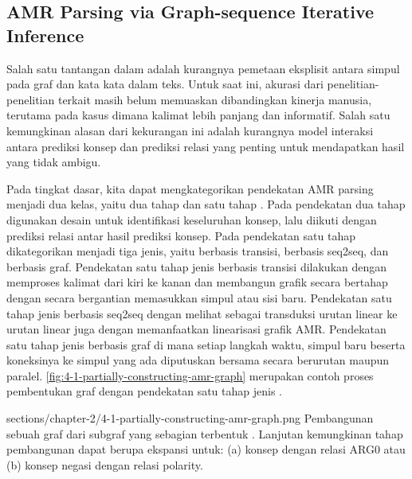 \subsection{AMR Parsing via Graph-sequence Iterative Inference }

Salah satu tantangan dalam \amrparsing{} adalah kurangnya pemetaan eksplisit antara simpul pada graf dan kata kata dalam teks.
Untuk saat ini, akurasi  dari penelitian-penelitian terkait masih belum memuaskan dibandingkan kinerja manusia, terutama pada kasus dimana kalimat lebih panjang dan informatif.
Salah satu kemungkinan alasan dari kekurangan ini adalah kurangnya model interaksi antara prediksi konsep dan prediksi relasi yang penting untuk mendapatkan hasil yang tidak ambigu.

Pada tingkat dasar, kita dapat mengkategorikan pendekatan AMR parsing menjadi dua kelas, yaitu dua tahap  dan satu tahap  .
Pada pendekatan dua tahap  digunakan desain  untuk identifikasi keseluruhan konsep, lalu diikuti dengan prediksi relasi antar hasil prediksi konsep.
Pada pendekatan satu tahap  dikategorikan menjadi tiga jenis, yaitu  berbasis transisi,  berbasis \gls{seq2seq}, dan  berbasis graf.
Pendekatan satu tahap jenis  berbasis transisi dilakukan dengan memproses kalimat dari kiri ke kanan dan membangun grafik secara bertahap dengan secara bergantian memasukkan simpul atau sisi baru.
Pendekatan satu tahap jenis  berbasis \gls{seq2seq} dengan melihat  sebagai transduksi urutan linear ke urutan linear juga dengan memanfaatkan linearisasi grafik AMR.
Pendekatan satu tahap jenis  berbasis graf di mana setiap langkah waktu, simpul baru beserta koneksinya ke simpul yang ada diputuskan bersama secara berurutan maupun paralel.
\cref{fig:4-1-partially-constructing-amr-graph} merupakan contoh proses pembentukan graf \AMR{} dengan pendekatan satu tahap jenis .

  {sections/chapter-2/4-1-partially-constructing-amr-graph.png}
  {
    Pembangunan sebuah graf \AMR{} dari subgraf \AMR{} yang sebagian terbentuk .
    Lanjutan kemungkinan tahap pembangunan dapat berupa ekspansi untuk: (a) konsep  dengan relasi ARG0 atau (b) konsep negasi dengan relasi polarity.
  }

